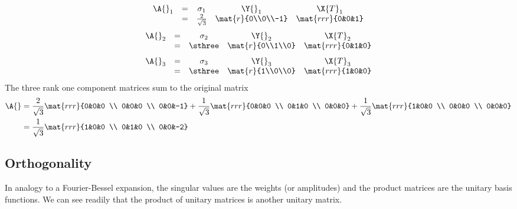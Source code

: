 \begin{equation}
  \begin{array}{ccccccccccccc}
    \A{}_{1} &=& \sigma_{1} & \Y{}_{1} & \X{T}_{1} \\
    &=& \frac{2}{\sqrt{3}} & \mat{r}{0\\0\\-1}&\mat{rrr}{0&0&1}
  \end{array}
\end{equation}
\begin{equation}
  \begin{array}{ccccccccccccc}
    \A{}_{2} &=& \sigma_{2} & \Y{}_{2} & \X{T}_{2} \\
    &=& \sthree& \mat{r}{0\\1\\0}&\mat{rrr}{0&1&0}
  \end{array}
\end{equation}
\begin{equation}
  \begin{array}{ccccccccccccc}
    \A{}_{3} &=& \sigma_{3} & \Y{}_{3} & \X{T}_{3} \\
    &=& \sthree & \mat{r}{1\\0\\0}&\mat{rrr}{1&0&0}
  \end{array}
\end{equation}
The three rank one component matrices sum to the original matrix
\begin{equation}
  \begin{split}
    \A{} &= \frac{2}{\sqrt{3}}  \mat{rrr}{0&0&0 \\ 0&0&0 \\ 0&0&-1} + \frac{1}{\sqrt{3}}  \mat{rrr}{0&0&0 \\ 0&1&0 \\ 0&0&0} + \frac{1}{\sqrt{3}}  \mat{rrr}{1&0&0 \\ 0&0&0 \\ 0&0&0}\\
    &=\frac{1}{\sqrt{3}} \mat{rrr}{1&0&0 \\ 0&1&0 \\ 0&0&-2}
  \end{split}
\end{equation}

\subsection{Orthogonality}
In analogy to a Fourier-Bessel expansion, the singular values are the weights (or amplitudes) and the product matrices are the unitary basis functions. We can see readily that the product of unitary matrices is another unitary matrix.

